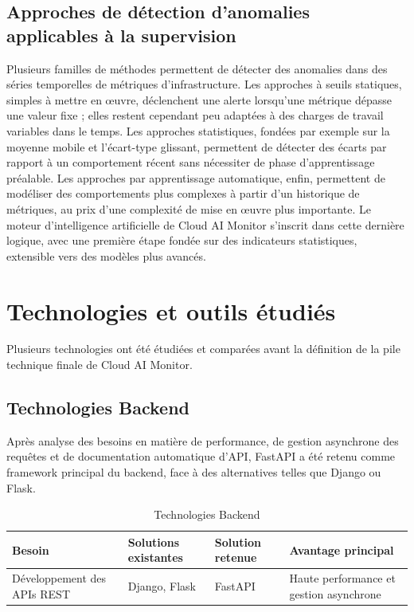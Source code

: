 \documentclass[11pt,a4paper]{report}
\begin{document}
\subsection{Approches de détection d'anomalies applicables à la supervision}

Plusieurs familles de méthodes permettent de détecter des anomalies dans des
séries temporelles de métriques d'infrastructure. Les approches à seuils
statiques, simples à mettre en œuvre, déclenchent une alerte lorsqu'une
métrique dépasse une valeur fixe ; elles restent cependant peu adaptées à des
charges de travail variables dans le temps. Les approches statistiques,
fondées par exemple sur la moyenne mobile et l'écart-type glissant,
permettent de détecter des écarts par rapport à un comportement récent sans
nécessiter de phase d'apprentissage préalable. Les approches par apprentissage
automatique, enfin, permettent de modéliser des comportements plus complexes
à partir d'un historique de métriques, au prix d'une complexité de mise en
œuvre plus importante. Le moteur d'intelligence artificielle de Cloud AI
Monitor s'inscrit dans cette dernière logique, avec une première étape fondée
sur des indicateurs statistiques, extensible vers des modèles plus avancés.


\section{Technologies et outils étudiés}

Plusieurs technologies ont été étudiées et comparées avant la définition de
la pile technique finale de Cloud AI Monitor.

\subsection{Technologies Backend}

Après analyse des besoins en matière de performance, de gestion asynchrone
des requêtes et de documentation automatique d'API, FastAPI a été retenu
comme framework principal du backend, face à des alternatives telles que
Django ou Flask.

\begin{table}[H]
\centering
\renewcommand{\arraystretch}{1.3}
\begin{tabular}{|p{3cm}|p{3.8cm}|p{3.2cm}|p{4cm}|}
\hline
\textbf{Besoin} & \textbf{Solutions existantes} & \textbf{Solution retenue} & \textbf{Avantage principal} \\
\hline
Développement des APIs REST & Django, Flask & FastAPI & Haute performance et gestion asynchrone \\
\hline
\end{tabular}
\caption{Technologies Backend}
\end{table}
\end{document}
